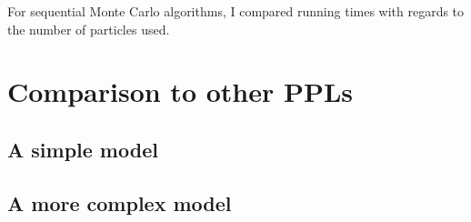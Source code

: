For sequential Monte Carlo algorithms, I compared running times with regards to the number of particles used.
				

\section{Comparison to other PPLs}

\subsection{A simple model}
\subsection{A more complex model}
